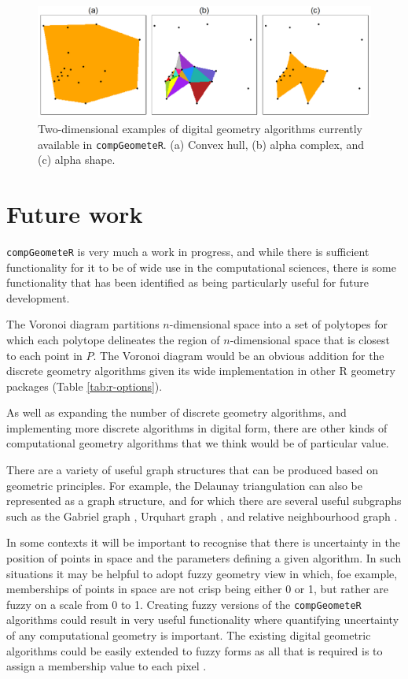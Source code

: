 \documentclass[12pt, a4paper]{article}
\begin{document}
\begin{figure}[ht]
\centering
\includegraphics{figures/digital-algorithms/digital-algorithms.png}
\caption{Two-dimensional examples of digital geometry algorithms currently available in \texttt{compGeometeR}. (a) Convex hull, (b) alpha complex, and (c) alpha shape.}
\label{fig:digital-algorithms}
\end{figure}

\section{Future work}

\texttt{compGeometeR} is very much a work in progress, and while there is sufficient functionality for it to be of wide use in the computational sciences, there is some functionality that has been identified as being particularly useful for future development.

The Voronoi diagram \citep{voronoi-1908, okabe-2000} partitions $n$-dimensional space into a set of polytopes for which each polytope delineates the region of $n$-dimensional space that is closest to each point in $P$.  The Voronoi diagram would be an obvious addition for the discrete geometry algorithms given its wide implementation in other R geometry packages (Table \ref{tab:r-options}).

As well as expanding the number of discrete geometry algorithms, and implementing more discrete algorithms in digital form, there are other kinds of computational geometry algorithms that we think would be of particular value.

There are a variety of useful graph structures that can be produced based on geometric principles.  For example, the Delaunay triangulation \citep{delaunay-1934} can also be represented as a graph structure, and for which there are several useful subgraphs such as the Gabriel graph \citep{gabriel-1969}, Urquhart graph \citep{urquhart-1980}, and relative neighbourhood graph \citep{toussaint-1980}.

In some contexts it will be important to recognise that there is uncertainty in the position of points in space and the parameters defining a given algorithm.  In such situations it may be helpful to adopt fuzzy geometry \citep{rosenfeld-1998} view in which, foe example, memberships of points in space are not crisp being either 0 or 1, but rather are fuzzy on a scale from 0 to 1.  Creating fuzzy versions of the \texttt{compGeometeR} algorithms could result in very useful functionality where quantifying uncertainty of any computational geometry is important.  The existing digital geometric algorithms could be easily extended to fuzzy forms as all that is required is to assign a membership value to each pixel \citep{klette-2004}.
\end{document}
